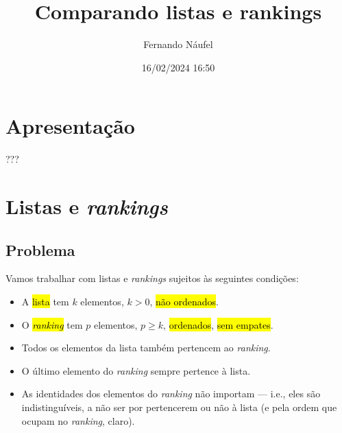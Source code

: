\documentclass[
  letterpaper,
  DIV=11,
  numbers=noendperiod]{scrreprt}
\title{Comparando listas e rankings}
\author{Fernando Náufel}
\date{16/02/2024 16:50}
\renewcommand*\contentsname{Índice}
\newcommand\contentsname{Índice}
\begin{document}
\maketitle

\makeatletter
{}
{}
{}
\makeatother


\renewcommand*\contentsname{Índice}
{
\hypersetup{linkcolor=}
\setcounter{tocdepth}{2}
\tableofcontents
}

\chapter*{Apresentação}\label{apresentauxe7uxe3o}


???


\chapter{\texorpdfstring{Listas e
\emph{rankings}}{Listas e rankings}}\label{listas-e-rankings}

\section{Problema}\label{problema}

Vamos trabalhar com listas e \emph{rankings} sujeitos às seguintes
condições:

\begin{itemize}
\item
  A {\hl{lista}} tem $k$ elementos, $k > 0$, {\hl{não ordenados}}.
\item
  O {\hl{\emph{ranking}}} tem $p$ elementos, $p \geq k$,
  {\hl{ordenados}}, {\hl{sem empates}}.
\item
  Todos os elementos da lista também pertencem ao \emph{ranking}.
\item
  O último elemento do \emph{ranking} sempre pertence à lista.
\item
  As identidades dos elementos do \emph{ranking} não importam --- i.e.,
  eles são indistinguíveis, a não ser por pertencerem ou não à lista (e
  pela ordem que ocupam no \emph{ranking}, claro).
\end{itemize}
\end{document}
